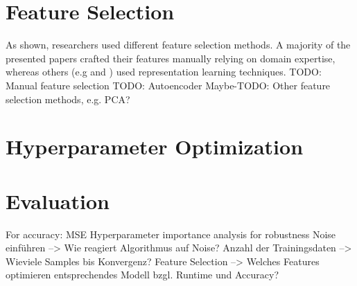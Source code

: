 \section{Feature Selection}

As shown, researchers used different feature selection methods. A majority of the presented papers crafted their features manually relying on domain expertise, whereas others (e.g \cite{Siripanpornchana2016_AnnWithDbnFS} and \cite{Huang2018_GBDT}) used representation learning techniques.
\newline
TODO: Manual feature selection
\newline 
TODO: Autoencoder
\newline
Maybe-TODO: Other feature selection methods, e.g. PCA?

\section{Hyperparameter Optimization}

\section{Evaluation} 
For accuracy: MSE 
\newline
Hyperparameter importance analysis for robustness
\newline
Noise einführen 
--> Wie reagiert Algorithmus auf Noise?
\newline
Anzahl der Trainingsdaten 
--> Wieviele Samples bis Konvergenz?
\newline
Feature Selection
--> Welches Features optimieren entsprechendes Modell bzgl. Runtime und Accuracy?
